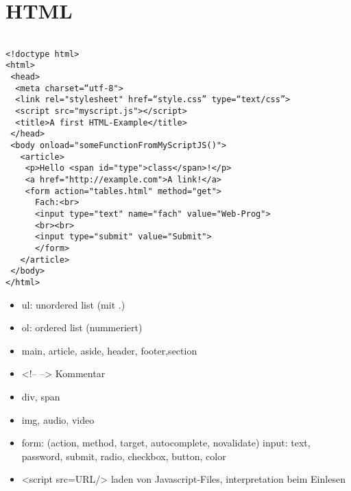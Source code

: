\section*{HTML}
\begin{verbatim}

<!doctype html>
<html>
 <head>
  <meta charset=“utf-8">
  <link rel="stylesheet" href=“style.css” type=“text/css”>
  <script src="myscript.js"></script>
  <title>A first HTML-Example</title>
 </head>
 <body onload="someFunctionFromMyScriptJS()">
   <article>
    <p>Hello <span id="type">class</span>!</p>
    <a href="http://example.com">A link!</a>
    <form action="tables.html" method="get">
      Fach:<br>
      <input type="text" name="fach" value="Web-Prog">
      <br><br>
      <input type="submit" value="Submit">
      </form>
   </article>
 </body>
</html>
\end{verbatim}

\begin{itemize}
\item ul: unordered list (mit .)
\item ol: ordered list (nummeriert)
\item main, article, aside, header, footer,section
\item <!-- --> Kommentar
\item div, span
\item img, audio, video
\item form: (action, method, target, autocomplete, novalidate)
   input: text, password, submit, radio, checkbox, button, color
  \item <script src=URL/> laden von Javascript-Files, interpretation beim Einlesen
\end{itemize}



